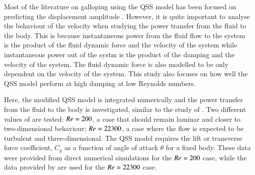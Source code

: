 Most of the literature on galloping using the QSS model has been focused on predicting the displacement amplitude \citep{Parkinson1964,Joly2012,Luo2003}. However, it is quite important to analyse the behaviour of the velocity when studying the power transfer from the fluid to the body. This is because instantaneous power from the fluid flow to the system is the product of the fluid dynamic force and the velocity of the system while instantaneous power out of the systm is the product of the damping and the velocity of the system. The fluid dynamic force is also modelled to be only dependent on the velocity of the system. This study also focuses on how well the QSS model perform at high damping at low Reynolds numbers. 

Here, the modified QSS model is integrated numerically and the power transfer from the fluid to the body is investigated, similar to the study of \citet{Barrero-Gil2010a}. Two different values of \reynoldsnumber are tested: $Re = 200$, a case that should remain laminar and closer to two-dimensional behaviour; $Re = 22300$, a case where the flow is expected to be turbulent and three-dimensional. The QSS model requires the lift or transverse force coefficient, $C_y$ as a function of angle of attack $\theta$ for a fixed body. These data were provided from direct numerical simulations for the $Re = 200$ case, while the data provided by \citet{Parkinson1964} are used for the $Re = 22300$ case.

